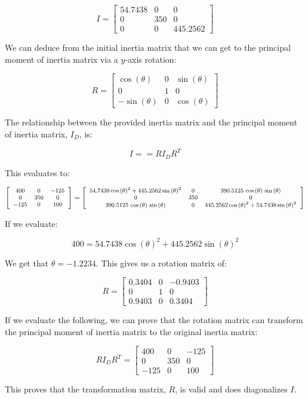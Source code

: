 \documentclass[12pt, letterpaper]{../assignment}
\begin{document}
\begin{answer}
$$ I = \left[\begin{array}{ccc} 54.7438 & 0 & 0\\ 0 & 350 & 0\\ 0 & 0 & 445.2562 \end{array}\right] $$
\end{answer}

We can deduce from the initial inertia matrix that we can get to the principal moment of inertia matrix via a $y$-axis rotation:

$$ R = \left[\begin{array}{ccc} \cos\left(\theta \right) & 0 & \sin\left(\theta \right)\\ 0 & 1 & 0\\ -\sin\left(\theta \right) & 0 & \cos\left(\theta \right) \end{array}\right] $$

The relationship between the provided inertia matrix and the principal moment of inertia matrix, $I_D$, is:

$$ I == R I_D R^T $$

This evaluates to:

$$ \footnotesize \left[\begin{array}{ccc} 400 & 0 & -125\\ 0 & 350 & 0\\ -125 & 0 & 100 \end{array}\right]
= \left[\begin{array}{ccc} 54.7438\,{\cos\left(\theta \right)}^2+445.2562\,{\sin\left(\theta \right)}^2 & 0 & 390.5125\,\cos\left(\theta \right)\,\sin\left(\theta \right)\\ 0 & 350 & 0\\ 390.5125\,\cos\left(\theta \right)\,\sin\left(\theta \right) & 0 & 445.2562\,{\cos\left(\theta \right)}^2+54.7438\,{\sin\left(\theta \right)}^2 \end{array}\right] $$

If we evaluate:

$$ 400 = 54.7438 \cos(\theta)^2 + 445.2562 \sin(\theta)^2 $$

We get that $\theta = -1.2234 $.
This gives us a rotation matrix of:

\begin{answer}
$$ R = \left[\begin{array}{ccc} 0.3404 & 0 & -0.9403\\ 0 & 1 & 0\\ 0.9403 & 0 & 0.3404 \end{array}\right] $$
\end{answer}

If we evaluate the following, we can prove that the rotation matrix can transform the principal moment of inertia matrix to the original inertia matrix:

$$ R I_D R^T = \left[\begin{array}{ccc} 400 & 0 & -125\\ 0 & 350 & 0\\ -125 & 0 & 100 \end{array}\right] $$

This proves that the transformation matrix, $R$, is valid and does diagonalizes $I$.
\end{document}
